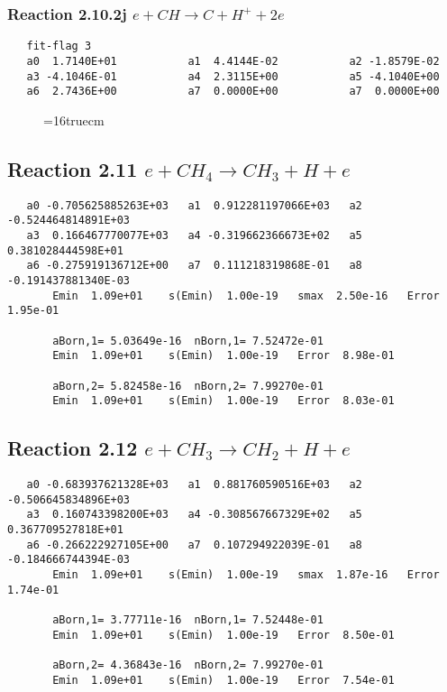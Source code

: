 \documentclass[12pt]{article}
\begin{document}
\subsubsection{
Reaction 2.10.2j  $e + CH \rightarrow C + H^{+} + 2e$
}

\begin{small}\begin{verbatim} 
   fit-flag 3
   a0  1.7140E+01           a1  4.4144E-02           a2 -1.8579E-02
   a3 -4.1046E-01           a4  2.3115E+00           a5 -4.1040E+00
   a6  2.7436E+00           a7  0.0000E+00           a7  0.0000E+00   
\end{verbatim}\end{small}

\begin{figure} \label{met.1_2.10}
\epsfxsize=16truecm
\end{figure}
\newpage

\subsection{
Reaction 2.11      $e + CH_4 \rightarrow CH_3 + H + e$
}

\begin{small}\begin{verbatim} 
   a0 -0.705625885263E+03   a1  0.912281197066E+03   a2 -0.524464814891E+03
   a3  0.166467770077E+03   a4 -0.319662366673E+02   a5  0.381028444598E+01
   a6 -0.275919136712E+00   a7  0.111218319868E-01   a8 -0.191437881340E-03
       Emin  1.09e+01    s(Emin)  1.00e-19   smax  2.50e-16   Error  1.95e-01
 
       aBorn,1= 5.03649e-16  nBorn,1= 7.52472e-01
       Emin  1.09e+01    s(Emin)  1.00e-19   Error  8.98e-01
 
       aBorn,2= 5.82458e-16  nBorn,2= 7.99270e-01
       Emin  1.09e+01    s(Emin)  1.00e-19   Error  8.03e-01
\end{verbatim}\end{small}

\subsection{ 
Reaction 2.12      $e + CH_3 \rightarrow CH_2 + H + e$
}

\begin{small}\begin{verbatim}
   a0 -0.683937621328E+03   a1  0.881760590516E+03   a2 -0.506645834896E+03
   a3  0.160743398200E+03   a4 -0.308567667329E+02   a5  0.367709527818E+01
   a6 -0.266222927105E+00   a7  0.107294922039E-01   a8 -0.184666744394E-03
       Emin  1.09e+01    s(Emin)  1.00e-19   smax  1.87e-16   Error  1.74e-01
 
       aBorn,1= 3.77711e-16  nBorn,1= 7.52448e-01
       Emin  1.09e+01    s(Emin)  1.00e-19   Error  8.50e-01
 
       aBorn,2= 4.36843e-16  nBorn,2= 7.99270e-01
       Emin  1.09e+01    s(Emin)  1.00e-19   Error  7.54e-01
\end{verbatim}\end{small}
\end{document}
